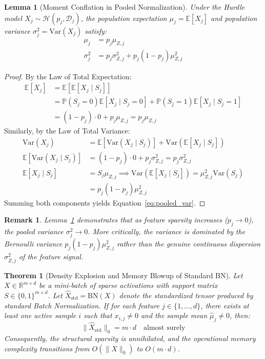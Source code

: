 \documentclass[twocolumn,10pt]{article}
\newtheorem{theorem}{Theorem}
\newtheorem{lemma}{Lemma}
\newtheorem{remark}{Remark}
\begin{document}
\begin{lemma}[Moment Conflation in Pooled Normalization]
\label{lem:moment_conflation}
Under the Hurdle model $X_j \sim \mathcal{H}(p_j, \mathcal{D}_j)$, the population expectation $\mu_j = \mathbb{E}[X_j]$ and population variance $\sigma_j^2 = \mathrm{Var}(X_j)$ satisfy:
\begin{align}
\mu_j &= p_j \mu_{Z,j} \label{eq:pooled_mean} \\
\sigma_j^2 &= p_j \sigma_{Z,j}^2 + p_j(1 - p_j)\mu_{Z,j}^2 \label{eq:pooled_var}
\end{align}
\end{lemma}

\begin{proof}
By the Law of Total Expectation:
\begin{align*}
\mathbb{E}[X_j] &= \mathbb{E}[\mathbb{E}[X_j \mid S_j]] \\
&= \mathbb{P}(S_j = 0)\mathbb{E}[X_j \mid S_j = 0] + \mathbb{P}(S_j = 1)\mathbb{E}[X_j \mid S_j = 1] \\
&= (1 - p_j) \cdot 0 + p_j \mu_{Z,j} = p_j \mu_{Z,j}
\end{align*}
Similarly, by the Law of Total Variance:
\begin{align*}
\mathrm{Var}(X_j) &= \mathbb{E}[\mathrm{Var}(X_j \mid S_j)] + \mathrm{Var}(\mathbb{E}[X_j \mid S_j]) \\
\mathbb{E}[\mathrm{Var}(X_j \mid S_j)] &= (1 - p_j) \cdot 0 + p_j \sigma_{Z,j}^2 = p_j \sigma_{Z,j}^2 \\
\mathbb{E}[X_j \mid S_j] &= S_j \mu_{Z,j} \implies \mathrm{Var}(\mathbb{E}[X_j \mid S_j]) = \mu_{Z,j}^2 \mathrm{Var}(S_j) \\
&= p_j(1 - p_j)\mu_{Z,j}^2
\end{align*}
Summing both components yields Equation~\eqref{eq:pooled_var}.
\end{proof}

\begin{remark}
Lemma~\ref{lem:moment_conflation} demonstrates that as feature sparsity increases ($p_j \to 0$), the pooled variance $\sigma_j^2 \to 0$. More critically, the variance is dominated by the Bernoulli variance $p_j(1-p_j)\mu_{Z,j}^2$ rather than the genuine continuous dispersion $\sigma_{Z,j}^2$ of the feature signal.
\end{remark}

\begin{theorem}[Density Explosion and Memory Blowup of Standard BN]
\label{thm:density_explosion}
Let $X \in \mathbb{R}^{m \times d}$ be a mini-batch of sparse activations with support matrix $S \in \{0, 1\}^{m \times d}$. Let $\hat{X}_{\mathrm{std}} = \mathrm{BN}(X)$ denote the standardized tensor produced by standard Batch Normalization. If for each feature $j \in \{1, \dots, d\}$, there exists at least one active sample $i$ such that $x_{i,j} \neq 0$ and the sample mean $\hat{\mu}_j \neq 0$, then:
\begin{equation}
\|\hat{X}_{\mathrm{std}}\|_0 = m \cdot d \quad \text{almost surely}
\end{equation}
Consequently, the structural sparsity is annihilated, and the operational memory complexity transitions from $O(\|X\|_0)$ to $O(m \cdot d)$.
\end{theorem}
\end{document}
